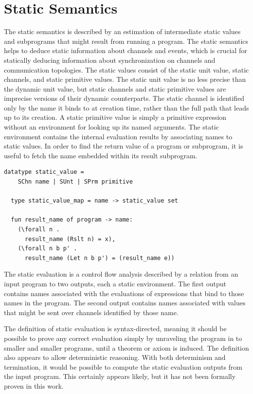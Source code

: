 \documentclass{article}
\begin{document}
\section{Static Semantics}
The static semantics is described by an estimation of
intermediate static values and subprograms
that might result from running a program.    
The static semantics helps to deduce static information about channels and events, which is
crucial for statically deducing information about synchronization on channels and
communication topologies.
The static values consist of the static unit value, static channels, and static primitive
values. The static unit value is no less precise than the dynamic unit value, but
static channels and static primitive values are imprecise versions of their dynamic
counterparts. The static channel is identified only by the name it binds to at creation time,
rather than the full path that leads up to its creation.  A static primitive value is simply a
primitive expression without an environment for looking up its named arguments. The static
environment contains the internal evaluation results by associating names to static values.
In order to find the return value of a program or subprogram, it is useful to fetch the name
embedded within its result subprogram.

\begin{lstlisting}[language=logic, mathescape]
  datatype static_value =
    SChn name | SUnt | SPrm primitive 

  type static_value_map = name -> static_value set

  fun result_name of program -> name:
    (\forall n .
      result_name (Rslt n) = x),
    (\forall n b p' . 
      result_name (Let n b p') = (result_name e))
  \end{lstlisting}


The static evaluation is a control flow analysis described by a relation from an input program
to two outputs, each a static environment. The first output contains names associated with the
evaluations of expressions that bind to those names in the program. The second output contains
names associated with values that might be sent over channels identified by those name.

The definition of static evaluation is syntax-directed, meaning it should be possible to
prove any correct evaluation simply by unraveling the program in to smaller and smaller
programs, until a theorem or axiom is induced. The definition also appears to allow
deterministic reasoning. With both determinism and termination, it would be possible to compute
the static evaluation outputs from the input program. This certainly appears likely, but it has
not been formally proven in this work.
\end{document}

